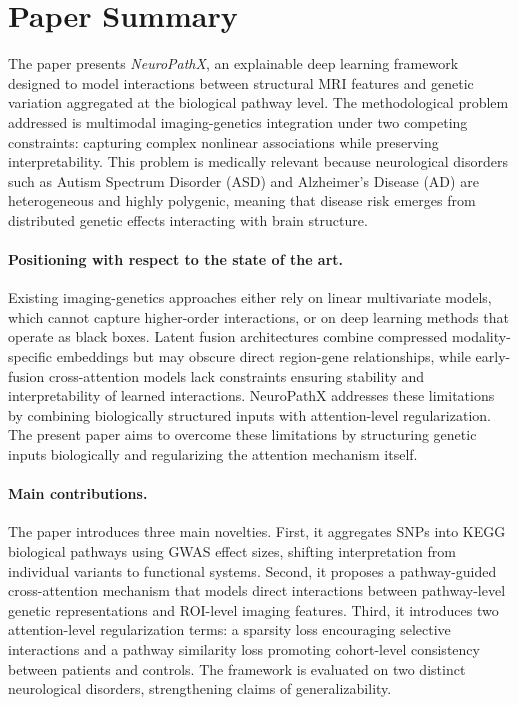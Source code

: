 \section{Paper Summary}

The paper presents \textit{NeuroPathX}, an explainable deep learning framework designed to model interactions between structural MRI features and genetic variation aggregated at the biological pathway level. The methodological problem addressed is multimodal imaging-genetics integration under two competing constraints: capturing complex nonlinear associations while preserving interpretability. This problem is medically relevant because neurological disorders such as Autism Spectrum Disorder (ASD) and Alzheimer's Disease (AD) are heterogeneous and highly polygenic, meaning that disease risk emerges from distributed genetic effects interacting with brain structure.

\paragraph{Positioning with respect to the state of the art.}
Existing imaging-genetics approaches either rely on linear multivariate models, which cannot capture higher-order interactions, or on deep learning methods that operate as black boxes. Latent fusion architectures combine compressed modality-specific embeddings but may obscure direct region-gene relationships, while early-fusion cross-attention models lack constraints ensuring stability and interpretability of learned interactions. NeuroPathX addresses these limitations by combining biologically structured inputs with attention-level regularization. The present paper aims to overcome these limitations by structuring genetic inputs biologically and regularizing the attention mechanism itself.

\paragraph{Main contributions.}
The paper introduces three main novelties. First, it aggregates SNPs into KEGG biological pathways using GWAS effect sizes, shifting interpretation from individual variants to functional systems. Second, it proposes a pathway-guided cross-attention mechanism that models direct interactions between pathway-level genetic representations and ROI-level imaging features. Third, it introduces two attention-level regularization terms: a sparsity loss encouraging selective interactions and a pathway similarity loss promoting cohort-level consistency between patients and controls. The framework is evaluated on two distinct neurological disorders, strengthening claims of generalizability.

